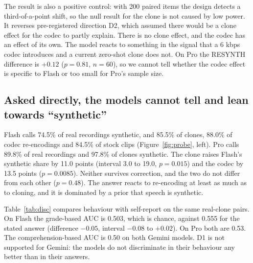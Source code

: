 The result is also a positive control: with 200 paired items the design detects a third-of-a-point shift, so the null result for the clone is not caused by low power. It reverses pre-registered direction D2, which assumed there would be a clone effect for the codec to partly explain. There is no clone effect, and the codec has an effect of its own. The model reacts to something in the signal that a 6 kbps codec introduces and a current zero-shot clone does not. On Pro the RESYNTH difference is $+0.12$ ($p = 0.81$, $n = 60$), so we cannot tell whether the codec effect is specific to Flash or too small for Pro's sample size.

\subsection{Asked directly, the models cannot tell and lean towards ``synthetic''}
\label{sec:results-probe}

Flash calls 74.5\% of real recordings synthetic, and 85.5\% of clones, 88.0\% of codec re-encodings and 84.5\% of stock clips (Figure~\ref{fig:probe}, left). Pro calls 89.8\% of real recordings and 97.8\% of clones synthetic. The clone raises Flash's synthetic share by 11.0 points (interval 3.0 to 19.0, $p = 0.015$) and the codec by 13.5 points ($p = 0.0085$). Neither survives correction, and the two do not differ from each other ($p = 0.48$). The answer reacts to re-encoding at least as much as to cloning, and it is dominated by a prior that speech is synthetic.

Table~\ref{tab:disc} compares behaviour with self-report on the same real-clone pairs. On Flash the grade-based AUC is 0.503, which is chance, against 0.555 for the stated answer (difference $-0.05$, interval $-0.08$ to $+0.02$). On Pro both are 0.53. The comprehension-based AUC is 0.50 on both Gemini models. D1 is not supported for Gemini: the models do not discriminate in their behaviour any better than in their answers.

\begin{table}[t]
\small
\centering
{}
\caption{Provenance discriminability, chance $=0.5$ everywhere. Bold: best model per column. No value exceeds 0.58.}
\label{tab:disc}
\end{table}


